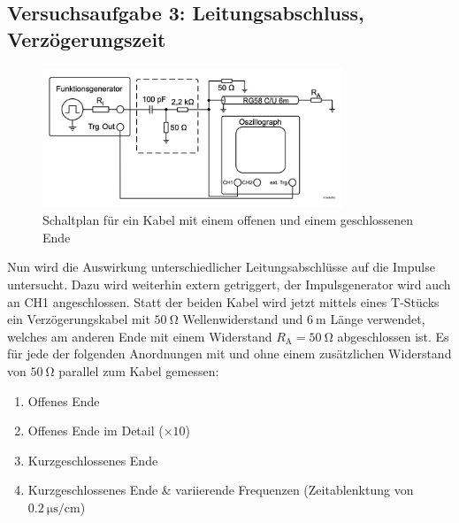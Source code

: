 \documentclass{article}
\begin{document}
\clearpage

\subsection{Versuchsaufgabe 3: Leitungsabschluss, Verzögerungszeit}
			
			\begin{figure}[H]
				\centering
				\includegraphics[width=0.8\textwidth]{figs/Aufbau_1_3_Leitungsabschluss.png}
				\caption{Schaltplan für ein Kabel mit einem offenen und einem geschlossenen Ende~\cite{anleitung}}
				\label{fig:aufbau_1_3_leitungsabschluss}
			\end{figure}
			Nun wird die Auswirkung unterschiedlicher Leitungsabschlüsse auf die Impulse untersucht. 
            Dazu wird weiterhin extern getriggert, der Impulsgenerator wird auch an CH1 angeschlossen. 
            Statt der beiden Kabel wird jetzt mittels eines T-Stücks ein Verzögerungskabel mit $\SI{50}{\ohm}$ 
            Wellenwiderstand und $\SI{6}{\meter}$ Länge verwendet, welches am anderen Ende mit einem Widerstand 
            $R_\mathrm{A} = \SI{50}{\ohm}$ abgeschlossen ist. Es für jede der folgenden Anordnungen mit und 
            ohne einem zusätzlichen Widerstand von $\SI{50}{\ohm}$ parallel zum Kabel gemessen:
			\begin{enumerate}[label=\alph*]
				\item Offenes Ende
				\item Offenes Ende im Detail ($\times 10$)
				\item Kurzgeschlossenes Ende
				\item Kurzgeschlossenes Ende \& variierende Frequenzen (Zeitablenktung von $\SI{0.2}{\micro\second\per\centi\meter}$)
			\end{enumerate}
\end{document}
